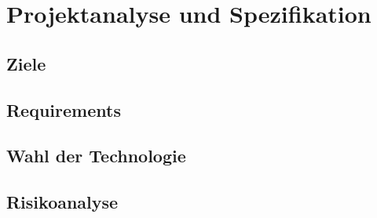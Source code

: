 \chapter{Projektanalyse und Spezifikation}
\label{kap-projektanalyse}

\section{Ziele}

\section{Requirements}

\section{Wahl der Technologie}

\section{Risikoanalyse}



